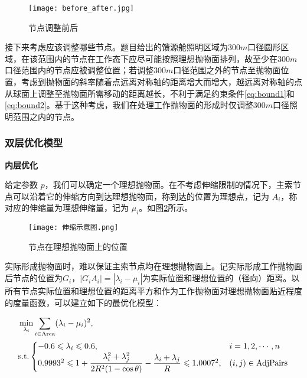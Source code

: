 \documentclass[withoutpreface,bwprint,fontset=macnew]{cumcmthesis} %
\begin{document}
	\begin{figure}[!h]
		\centering
		\texttt{[image: before\_after.jpg]} %
		\caption{节点调整前后}
		\label{fig:before_after}
	\end{figure}
	
	
	接下来考虑应该调整哪些节点。题目给出的馈源舱照明区域为$300m$口径圆形区域，在该范围内的节点在工作态下应尽可能按照理想抛物面排列，故至少在$300m$口径范围内的节点应被调整位置；若调整$300m$口径范围之外的节点至抛物面位置，考虑到抛物面的斜率随着点远离对称轴的距离增大而增大，越远离对称轴的点从球面上调整至抛物面所需移动的距离越长，不利于满足约束条件\ref {eq:bound1}和\ref {eq:bound2}。基于这种考虑，我们在处理工作抛物面的形成时仅调整$300m$口径照明范围之内的节点。

	\subsubsection{双层优化模型}
	
	\textbf{内层优化}
	
	给定参数 $p$，我们可以确定一个理想抛物面。在不考虑伸缩限制的情况下，主索节点可以沿着它的伸缩方向到达理想抛物面，称到达的位置为理想点，记为 $A_i$，称对应的伸缩量为理想伸缩量，记为 $\mu_i$。如图\ref{fig:g_ideal}所示。
	
	\begin{figure}[!h]
		\centering
		\texttt{[image: 伸缩示意图.png]} %
		\caption{节点在理想抛物面上的位置}
		\label{fig:g_ideal}
	\end{figure}

	实际形成抛物面时，难以保证主索节点均在理想抛物面上。记实际形成工作抛物面后节点的位置为$G_{i}$，$|{G_{i}A_{i}}| = |\lambda_i-\mu_i|$为实际位置和理想位置的（径向）距离。以所有节点实际位置和理想位置的距离平方和作为工作抛物面对理想抛物面贴近程度的度量函数，可以建立如下的最优化模型：

	\begin{align}
		&\min_{\lambda_i} \sum_{i\in\text{Area}}(\lambda_i-\mu_i)^2, \notag \\
		&\text{s.t.}\begin{cases}
			-0.6 \leqslant \lambda_i \leqslant 0.6, & i=1,2,\cdots, n\\
			0.9993^2 \leqslant 1+\dfrac{\lambda_i^2+\lambda_j^2}{2R^2(1-\cos\theta)}-\dfrac{\lambda_i+\lambda_j}{R} \leqslant 1.0007^2,&(i,j)\in\text{AdjPairs}\\
		\end{cases}
		\label {opt:optimization_1}
	\end{align}
\end{document}
